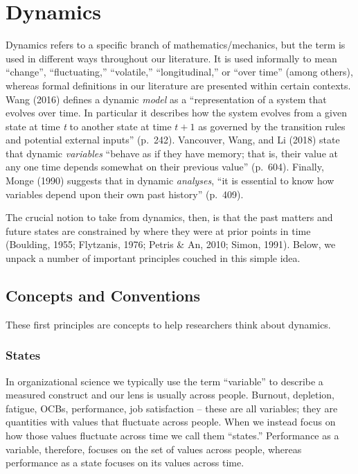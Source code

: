 \documentclass[english,,man]{apa6}
\theoremstyle{definition}
\theoremstyle{definition}
\theoremstyle{definition}
\theoremstyle{remark}
\begin{document}
\hypertarget{dynamics}{%
\section{Dynamics}\label{dynamics}}

Dynamics refers to a specific branch of mathematics/mechanics, but the
term is used in different ways throughout our literature. It is used
informally to mean \enquote{change}, \enquote{fluctuating,}
\enquote{volatile,} \enquote{longitudinal,} or \enquote{over time}
(among others), whereas formal definitions in our literature are
presented within certain contexts. Wang (2016) defines a dynamic
\emph{model} as a \enquote{representation of a system that evolves over
time. In particular it describes how the system evolves from a given
state at time \emph{t} to another state at time \(t + 1\) as governed by
the transition rules and potential external inputs} (p.~242). Vancouver,
Wang, and Li (2018) state that dynamic \emph{variables} \enquote{behave
as if they have memory; that is, their value at any one time depends
somewhat on their previous value} (p.~604). Finally, Monge (1990)
suggests that in dynamic \emph{analyses}, \enquote{it is essential to
know how variables depend upon their own past history} (p.~409).

The crucial notion to take from dynamics, then, is that the past matters
and future states are constrained by where they were at prior points in
time (Boulding, 1955; Flytzanis, 1976; Petris \& An, 2010; Simon, 1991).
Below, we unpack a number of important principles couched in this simple
idea.

\hypertarget{concepts-and-conventions}{%
\subsection{Concepts and Conventions}\label{concepts-and-conventions}}

These first principles are concepts to help researchers think about
dynamics.

\hypertarget{states}{%
\subsubsection{States}\label{states}}

In organizational science we typically use the term \enquote{variable}
to describe a measured construct and our lens is usually across people.
Burnout, depletion, fatigue, OCBs, performance, job satisfaction --
these are all variables; they are quantities with values that fluctuate
across people. When we instead focus on how those values fluctuate
across time we call them \enquote{states.} Performance as a variable,
therefore, focuses on the set of values across people, whereas
performance as a state focuses on its values across time.
\end{document}
